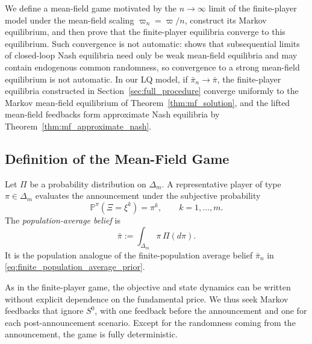 \documentclass[12pt]{article}
\numberwithin{equation}{section}
\theoremstyle{definition}
\begin{document}
We define a mean-field game motivated by the \(n\to\infty\) limit of the
finite-player model under the mean-field scaling \(\varpi_n=\varpi/n\), construct
its Markov equilibrium, and then prove that the finite-player equilibria
converge to this equilibrium. Such convergence is not automatic:
\citet{Lacker2020ClosedLoop} shows that
subsequential limits of closed-loop Nash equilibria need only be weak
mean-field equilibria and may contain endogenous common randomness, so
convergence to a strong mean-field equilibrium is not automatic. In our LQ
model, if
\(\bar\pi_n\to\bar\pi\), the finite-player equilibria constructed in
Section~\ref{sec:full_procedure} converge uniformly to the Markov mean-field
equilibrium of Theorem~\ref{thm:mf_solution}, and the lifted mean-field
feedbacks form approximate Nash equilibria by
Theorem~\ref{thm:mf_approximate_nash}.

\subsection{Definition of the Mean-Field Game}

Let \(\Pi\) be a probability distribution on \(\Delta_m\). A representative
player of type \(\pi\in\Delta_m\) evaluates the announcement under the
subjective probability
\[
\mathbb P^\pi(\Xi=\xi^k)=\pi^k,
\qquad k=1,\ldots,m.
\]
The \emph{population-average belief} is
\[
\bar\pi:=\int_{\Delta_m}\pi\,\Pi(d\pi).
\]
It is the population analogue of the finite-population average belief
\(\bar\pi_n\) in \eqref{eq:finite_population_average_prior}.

As in the finite-player game, the objective and state dynamics can be written
without explicit dependence on the fundamental price. We thus seek Markov feedbacks
that ignore \(S^0\), with one feedback before the announcement and one for each
post-announcement scenario. Except for the randomness coming from the
announcement, the game is fully deterministic.
\end{document}
